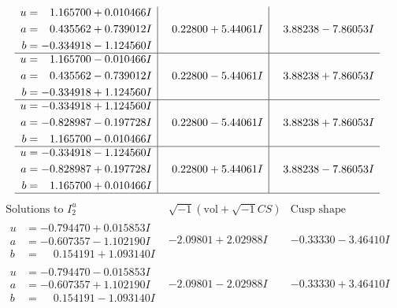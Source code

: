 \documentclass[1p]{elsarticle_modified}
\theoremstyle{definition}
\newcommand{\I}{\sqrt{-1}}
\begin{document}
$$\begin{array}{c|c|c}
\begin{aligned}
u &= \phantom{-}1.165700 + 0.010466 I \\
a &= \phantom{-}0.435562 + 0.739012 I \\
b &= -0.334918 - 1.124560 I\end{aligned}
 & \phantom{-}0.22800 + 5.44061 I & \phantom{-}3.88238 - 7.86053 I \\ \hline\begin{aligned}
u &= \phantom{-}1.165700 - 0.010466 I \\
a &= \phantom{-}0.435562 - 0.739012 I \\
b &= -0.334918 + 1.124560 I\end{aligned}
 & \phantom{-}0.22800 - 5.44061 I & \phantom{-}3.88238 + 7.86053 I \\ \hline\begin{aligned}
u &= -0.334918 + 1.124560 I \\
a &= -0.828987 - 0.197728 I \\
b &= \phantom{-}1.165700 - 0.010466 I\end{aligned}
 & \phantom{-}0.22800 - 5.44061 I & \phantom{-}3.88238 + 7.86053 I \\ \hline\begin{aligned}
u &= -0.334918 - 1.124560 I \\
a &= -0.828987 + 0.197728 I \\
b &= \phantom{-}1.165700 + 0.010466 I\end{aligned}
 & \phantom{-}0.22800 + 5.44061 I & \phantom{-}3.88238 - 7.86053 I\\
 \hline 
 \end{array}$$\newpage$$\begin{array}{c|c|c}  
\text{Solutions to }I^u_{2}& \I (\text{vol} + \sqrt{-1}CS) & \text{Cusp shape}\\
 \hline 
\begin{aligned}
u &= -0.794470 + 0.015853 I \\
a &= -0.607357 - 1.102190 I \\
b &= \phantom{-}0.154191 + 1.093140 I\end{aligned}
 & -2.09801 + 2.02988 I & -0.33330 - 3.46410 I \\ \hline\begin{aligned}
u &= -0.794470 - 0.015853 I \\
a &= -0.607357 + 1.102190 I \\
b &= \phantom{-}0.154191 - 1.093140 I\end{aligned}
 & -2.09801 - 2.02988 I & -0.33330 + 3.46410 I \\ \hline\begin{aligned}

\end{aligned}
\end{array}$$
\end{document}
